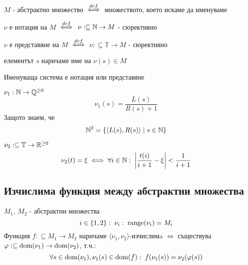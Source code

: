 \begin{notation}
    $M$ - абстрактно множество ${\overset{def}{\iff}}$ множеството, което искаме да именуваме
\end{notation}
\begin{definition}
     $\nu$ е нотация на $M$ ${\overset{def}{\iff}}$ $\nu: \subseteq {\mathbb{N}} \to M$ - сюрективно
\end{definition}
\begin{definition}
     $\nu$ е представяне на $M$ ${\overset{def}{\iff}}$ $\nu: \subseteq \mathbb T \to M$ - сюрективно
\end{definition}
\begin{notation}
    елементът $s$ наричаме име на $\nu(s) \in M$
\end{notation}
\begin{notation}
    Именуваща система е нотация или представяне
\end{notation}
\begin{example}
    $\nu_1: {\mathbb{N}} \to {\mathbb{Q}}^{\geq 0}$
    \begin{equation*}
        \nu_1(s) = \frac{L(s)}{R(s) + 1}
    \end{equation*}
    Защото знаем, че
    \begin{equation*}
        {\mathbb{N}}^2 = \left\{\langle L(s), R(s)\rangle\mid s \in {\mathbb{N}} \right\}
    \end{equation*}
\end{example}
\begin{example}
    $\nu_2: \subseteq \mathbb T \to {\mathbb{R}}^{\geq 0}$
    \begin{equation*}
        \nu_2(t) = \xi \iff \forall i\in{\mathbb{N}}:\;  \left|\frac{t(i)}{i+1} - \xi\right| < \frac{1}{i+1}
    \end{equation*}
\end{example}

\subsection{Изчислима функция между абстрактни множества}
\begin{definition}
    $M_1,\ M_2$ - абстрактни множества
    \begin{equation}
        i\in\{1, 2\}:\; \nu_i:\; \operatorname*{range}(\nu_i) = M_i
    \end{equation}
    Функция $f: \subseteq M_1 \to M_2$ наричаме $\langle \nu_1, \nu_2\rangle$-изчислимa $\iff$ съществува $\varphi: \subseteq \operatorname*{dom}(\nu_1) \to \operatorname*{dom}(\nu_2)$, т.ч.:
    \begin{equation}
        \forall s\in \operatorname*{dom}(\nu_1), \nu_1(s) \in \operatorname*{dom}(f):\; f(\nu_1(s)) = \nu_2(\varphi(s))
    \end{equation}
\end{definition}

